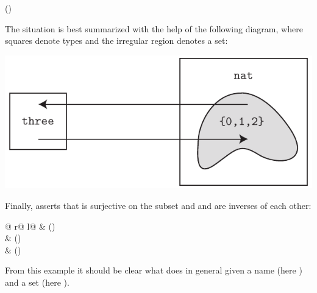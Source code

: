 \begin{isabellebody}
\begin{isamarkuptext}
\begin{center}
\hfill()
\end{center}
The situation is best summarized with the help of the following diagram,
where squares denote types and the irregular region denotes a set:
\begin{center}
\includegraphics[scale=.8]{typedef}
\end{center}
Finally,  asserts that  is
surjective on the subset  and  and  are inverses of each other:
\begin{center}
\begin{tabular}{@ {}r@ {\qquad\qquad}l@ {}}
 & () \\
 & () \\
 & ()
\end{tabular}
\end{center}
%
From this example it should be clear what  does
in general given a name (here ) and a set
(here ).


\end{isamarkuptext}
\end{isabellebody}
